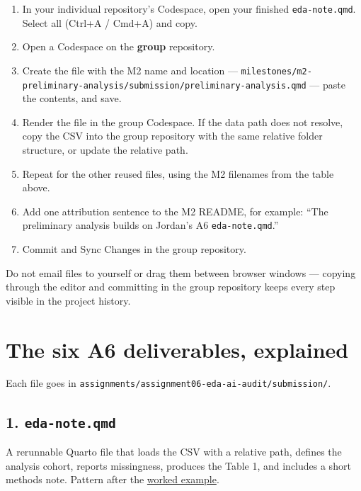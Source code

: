 \documentclass[
  letterpaper,
  DIV=11,
  numbers=noendperiod,
  oneside]{scrreprt}
\providecommand{\tightlist}{%
  \setlength{\itemsep}{0pt}\setlength{\parskip}{0pt}}
\begin{document}
\begin{enumerate}
\def\labelenumi{\arabic{enumi}.}
\tightlist
\item
  In your individual repository's Codespace, open your finished
  \texttt{eda-note.qmd}. Select all (Ctrl+A / Cmd+A) and copy.
\item
  Open a Codespace on the \textbf{group} repository.
\item
  Create the file with the M2 name and location ---
  \texttt{milestones/m2-preliminary-analysis/submission/preliminary-analysis.qmd}
  --- paste the contents, and save.
\item
  Render the file in the group Codespace. If the data path does not
  resolve, copy the CSV into the group repository with the same relative
  folder structure, or update the relative path.
\item
  Repeat for the other reused files, using the M2 filenames from the
  table above.
\item
  Add one attribution sentence to the M2 README, for example: ``The
  preliminary analysis builds on Jordan's A6 \texttt{eda-note.qmd}.''
\item
  Commit and Sync Changes in the group repository.
\end{enumerate}

Do not email files to yourself or drag them between browser windows ---
copying through the editor and committing in the group repository keeps
every step visible in the project history.

\section*{The six A6 deliverables,
explained}\label{the-six-a6-deliverables-explained}


Each file goes in
\texttt{assignments/assignment06-eda-ai-audit/submission/}.

\subsection*{\texorpdfstring{1.
\texttt{eda-note.qmd}}{1. eda-note.qmd}}\label{eda-note.qmd}

A rerunnable Quarto file that loads the CSV with a relative path,
defines the analysis cohort, reports missingness, produces the Table 1,
and includes a short methods note. Pattern after the
\hyperref[worked-example-eda-and-table-1]{worked example}.
\end{document}
